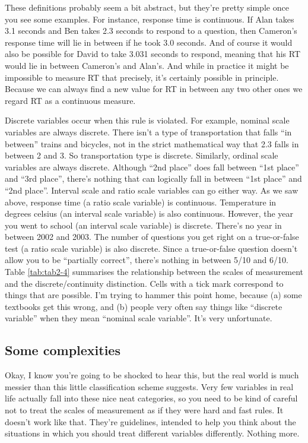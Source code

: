 \documentclass[
]{book}
\begin{document}
These definitions probably seem a bit abstract, but they're pretty simple once you see some examples. For instance, response time is continuous. If Alan takes 3.1 seconds and Ben takes 2.3 seconds to respond to a question, then Cameron's response time will lie in between if he took 3.0 seconds. And of course it would also be possible for David to take 3.031 seconds to respond, meaning that his RT would lie in between Cameron's and Alan's. And while in practice it might be impossible to measure RT that precisely, it's certainly possible in principle. Because we can always find a new value for RT in between any two other ones we regard RT as a continuous measure.

Discrete variables occur when this rule is violated. For example, nominal scale variables are always discrete. There isn't a type of transportation that falls ``in between'' trains and bicycles, not in the strict mathematical way that 2.3 falls in between 2 and 3. So transportation type is discrete. Similarly, ordinal scale variables are always discrete. Although ``2nd place'' does fall between ``1st place'' and ``3rd place'', there's nothing that can logically fall in between ``1st place'' and ``2nd place''. Interval scale and ratio scale variables can go either way. As we saw above, response time (a ratio scale variable) is continuous. Temperature in degrees celsius (an interval scale variable) is also continuous. However, the year you went to school (an interval scale variable) is discrete. There's no year in between 2002 and 2003. The number of questions you get right on a true-or-false test (a ratio scale variable) is also discrete. Since a true-or-false question doesn't allow you to be ``partially correct'', there's nothing in between 5/10 and 6/10. Table \ref{tab:tab2-4} summarises the relationship between the scales of measurement and the discrete/continuity distinction. Cells with a tick mark correspond to things that are possible. I'm trying to hammer this point home, because (a) some textbooks get this wrong, and (b) people very often say things like ``discrete variable'' when they mean ``nominal scale variable''. It's very unfortunate.

\hypertarget{some-complexities}{%
\subsection{Some complexities}\label{some-complexities}}

Okay, I know you're going to be shocked to hear this, but the real world is much messier than this little classification scheme suggests. Very few variables in real life actually fall into these nice neat categories, so you need to be kind of careful not to treat the scales of measurement as if they were hard and fast rules. It doesn't work like that. They're guidelines, intended to help you think about the situations in which you should treat different variables differently. Nothing more.
\end{document}
